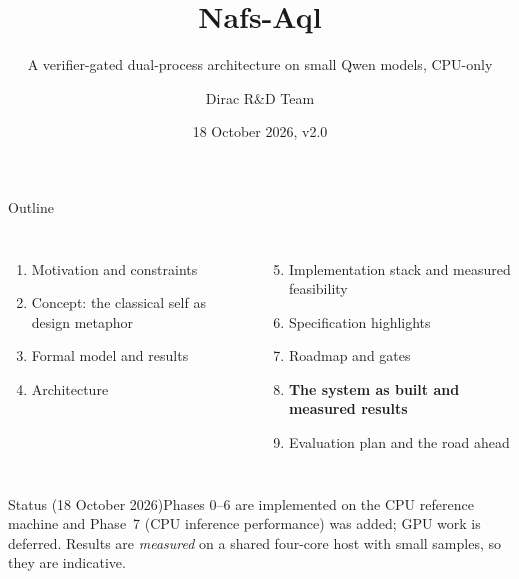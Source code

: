 \documentclass[aspectratio=169,10pt]{beamer}
\title{Nafs-Aql}
\subtitle{A verifier-gated dual-process architecture on small Qwen models, CPU-only}
\author{Dirac R\&D Team}
\date{18 October 2026, v2.0}
\begin{document}
\maketitle

\begin{frame}{Outline}
\begin{columns}[T]
\begin{enumerate}\item Motivation and constraints\item Concept: the classical self as design metaphor\item Formal model and results\item Architecture\end{enumerate}
\begin{enumerate}\setcounter{enumi}{4}\item Implementation stack and measured feasibility\item Specification highlights\item Roadmap and gates\item \textbf{The system as built and measured results}\item Evaluation plan and the road ahead\end{enumerate}
\end{columns}
\vspace{2pt}\begin{alertblock}{Status (18 October 2026)}Phases 0--6 are implemented on the CPU reference machine and Phase~7 (CPU inference performance) was added; GPU work is deferred. Results are \emph{measured} on a shared four-core host with small samples, so they are indicative.\end{alertblock}
\end{frame}
\end{document}
